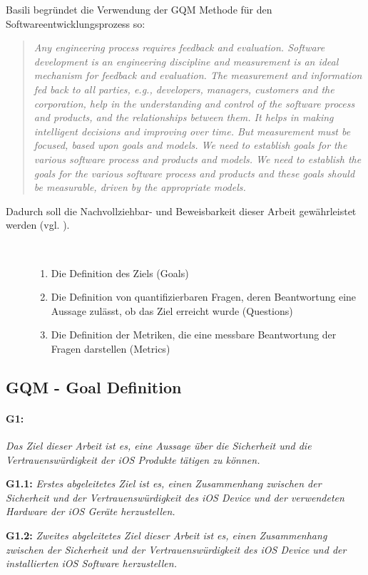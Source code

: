 Basili begründet die Verwendung der GQM Methode für den Softwareentwicklungsprozess so: 
\begin{quote}
    \textit{\glqq Any engineering process requires feedback and evaluation. Software development is an engineering discipline and measurement is an ideal mechanism for feedback and evaluation. The measurement and information fed back to all parties, e.g., developers, managers, customers and the corporation, help in the understanding and control of the software process and products, and the relationships between them. It helps in making intelligent decisions and improving over time. But measurement must be focused, based upon goals and models. We need to establish goals for the various software process and products and models. We need to establish the goals for the various software process and products and these goals should be measurable, driven by the appropriate models.\grqq{}} \cite{GQM[4]} 
\end{quote}
 
Dadurch soll die Nachvollziehbar- und Beweisbarkeit dieser Arbeit gewährleistet werden (vgl. \cite{GQM[3], GQM[4]}).
\begin{description}
    \item[\parbox{\textwidth} {Die GQM-Methode ist in drei Schritte unterteilt und dient zur Bewertung der erhobenen Daten}]~\par
    \begin{enumerate}
        \item Die Definition des Ziels (Goals)
        \item Die Definition von quantifizierbaren Fragen, deren Beantwortung eine Aussage zulässt, ob das Ziel erreicht wurde (Questions)
        \item Die Definition der Metriken, die eine messbare Beantwortung der Fragen darstellen (Metrics)
    \end{enumerate}
\end{description} 

\subsection{GQM - Goal Definition}
\label{sec:GQMGoal}

\paragraph{G1:} \textit{\glqq Das Ziel dieser Arbeit ist es, eine Aussage über die Sicherheit und die Vertrauenswürdigkeit der iOS Produkte tätigen zu können.\grqq{}} \par 
\textbf{G1.1:} \textit{\glqq Erstes abgeleitetes Ziel ist es, einen Zusammenhang zwischen der Sicherheit und der Vertrauenswürdigkeit des iOS Device und der verwendeten Hardware der iOS Geräte herzustellen.\grqq{}} \par 
\textbf{G1.2:} \textit{\glqq Zweites abgeleitetes Ziel dieser Arbeit ist es, einen Zusammenhang zwischen der Sicherheit und der Vertrauenswürdigkeit des iOS Device und der installierten iOS Software herzustellen.\grqq{}}

